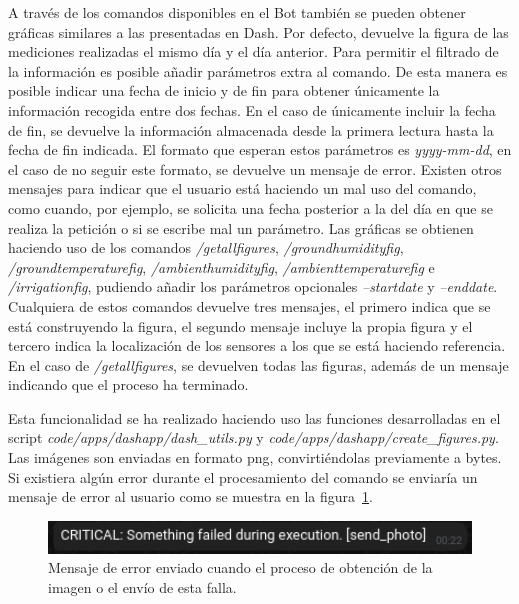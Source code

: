 \documentclass[a4paper, 12pt, oneside]{book}
\begin{document}
A través de los comandos disponibles en el Bot también se pueden obtener gráficas similares a las presentadas en Dash. Por defecto, devuelve la figura de las mediciones realizadas el mismo día y el día anterior. Para permitir el filtrado de la información es posible añadir parámetros extra al comando. De esta manera es posible indicar una fecha de inicio y de fin para obtener únicamente la información recogida entre dos fechas. En el caso de únicamente incluir la fecha de fin, se devuelve la información almacenada desde la primera lectura hasta la fecha de fin indicada. El formato que esperan estos parámetros es \textit{yyyy-mm-dd}, en el caso de no seguir este formato, se devuelve un mensaje de error.
Existen otros mensajes para indicar que el usuario está haciendo un mal uso del comando, como cuando, por ejemplo, se solicita una fecha posterior a la del día en que se realiza la petición o si se escribe mal un parámetro.
Las gráficas se obtienen haciendo uso de los comandos \textit{/getallfigures}, \textit{/groundhumidityfig}, \textit{/groundtemperaturefig}, \textit{/ambienthumidityfig}, \textit{/ambienttemperaturefig} e \textit{/irrigationfig}, pudiendo añadir los parámetros opcionales \textit{--startdate} y \textit{--enddate}. Cualquiera de estos comandos devuelve tres mensajes, el primero indica que se está construyendo la figura, el segundo mensaje incluye la propia figura y el tercero indica la localización de los sensores a los que se está haciendo referencia. En el caso de \textit{/getallfigures}, se devuelven todas las figuras, además de un mensaje indicando que el proceso ha terminado.

Esta funcionalidad se ha realizado haciendo uso las funciones desarrolladas en el script \textit{code/apps/dashapp/dash\_utils.py} y \textit{code/apps/dashapp/create\_figures.py}. Las imágenes son enviadas en formato png, convirtiéndolas previamente a bytes. Si existiera algún error durante el procesamiento del comando se enviaría un mensaje de error al usuario como se muestra en la figura~\ref{figura:error send photo}.
\begin{figure}[H]
	\centering
    \includegraphics[width=12cm, keepaspectratio]{img/error_send_photo}
    \caption{Mensaje de error enviado cuando el proceso de obtención de la imagen o el envío de esta falla.}
    \label{figura:error send photo}
\end{figure}
\end{document}
